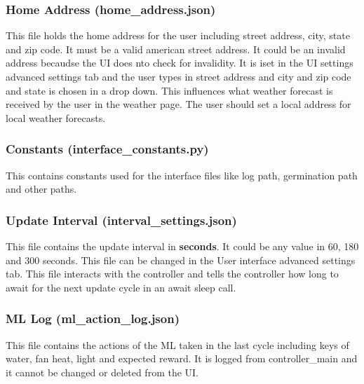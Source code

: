 \documentclass[
]{article}
\begin{document}
\hypertarget{home-address-home_address.json}{%
\subsubsection{Home Address
(home\_address.json)}\label{home-address-home_address.json}}

This file holds the home address for the user including street address,
city, state and zip code. It must be a valid american street address. It
could be an invalid address becaudse the UI does nto check for
invalidity. It is iset in the UI settings advanced settings tab and the
user types in street address and city and zip code and state is chosen
in a drop down. This influences what weather forecast is received by the
user in the weather page. The user should set a local address for local
weather forecasts.

\hypertarget{constants-interface_constants.py}{%
\subsubsection{Constants
(interface\_constants.py)}\label{constants-interface_constants.py}}

This contains constants used for the interface files like log path,
germination path and other paths.

\hypertarget{update-interval-interval_settings.json}{%
\subsubsection{Update Interval
(interval\_settings.json)}\label{update-interval-interval_settings.json}}

This file contains the update interval in \textbf{seconds}. It could be
any value in 60, 180 and 300 seconds. This file can be changed in the
User interface advanced settings tab. This file interacts with the
controller and tells the controller how long to await for the next
update cycle in an await sleep call.

\hypertarget{ml-log-ml_action_log.json}{%
\subsubsection{ML Log
(ml\_action\_log.json)}\label{ml-log-ml_action_log.json}}

This file contains the actions of the ML taken in the last cycle
including keys of water, fan heat, light and expected reward. It is
logged from controller\_main and it cannot be changed or deleted from
the UI.
\end{document}
